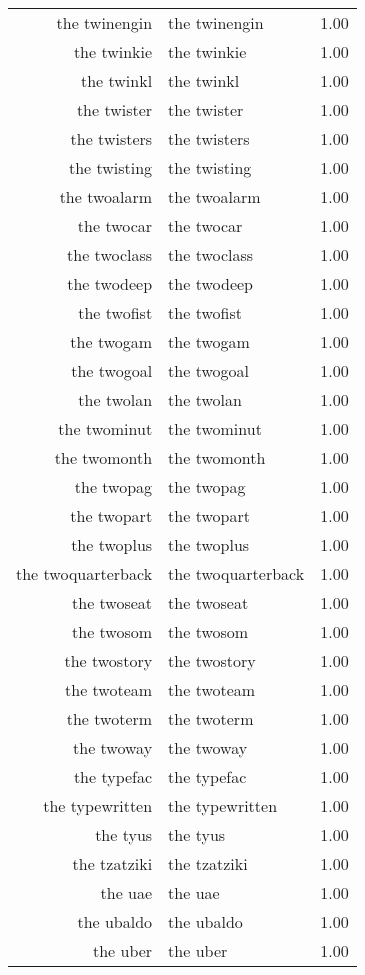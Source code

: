 \begin{table}[ht]
\begin{tabular}{rlr}
  the twinengin & the twinengin & 1.00 \\ 
  the twinkie & the twinkie & 1.00 \\ 
  the twinkl & the twinkl & 1.00 \\ 
  the twister & the twister & 1.00 \\ 
  the twisters & the twisters & 1.00 \\ 
  the twisting & the twisting & 1.00 \\ 
  the twoalarm & the twoalarm & 1.00 \\ 
  the twocar & the twocar & 1.00 \\ 
  the twoclass & the twoclass & 1.00 \\ 
  the twodeep & the twodeep & 1.00 \\ 
  the twofist & the twofist & 1.00 \\ 
  the twogam & the twogam & 1.00 \\ 
  the twogoal & the twogoal & 1.00 \\ 
  the twolan & the twolan & 1.00 \\ 
  the twominut & the twominut & 1.00 \\ 
  the twomonth & the twomonth & 1.00 \\ 
  the twopag & the twopag & 1.00 \\ 
  the twopart & the twopart & 1.00 \\ 
  the twoplus & the twoplus & 1.00 \\ 
  the twoquarterback & the twoquarterback & 1.00 \\ 
  the twoseat & the twoseat & 1.00 \\ 
  the twosom & the twosom & 1.00 \\ 
  the twostory & the twostory & 1.00 \\ 
  the twoteam & the twoteam & 1.00 \\ 
  the twoterm & the twoterm & 1.00 \\ 
  the twoway & the twoway & 1.00 \\ 
  the typefac & the typefac & 1.00 \\ 
  the typewritten & the typewritten & 1.00 \\ 
  the tyus & the tyus & 1.00 \\ 
  the tzatziki & the tzatziki & 1.00 \\ 
  the uae & the uae & 1.00 \\ 
  the ubaldo & the ubaldo & 1.00 \\ 
  the uber & the uber & 1.00 \\ 

\end{tabular}
\end{table}
